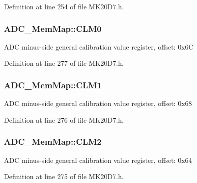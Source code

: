 Definition at line 254 of file M\+K20\+D7.\+h.

\subsubsection[{\texorpdfstring{C\+L\+M0}{CLM0}}]{ A\+D\+C\+\_\+\+Mem\+Map\+::\+C\+L\+M0}\hypertarget{struct_a_d_c___mem_map_a1b8eeb87fa8308fe93200b6e82985c25}{}\label{struct_a_d_c___mem_map_a1b8eeb87fa8308fe93200b6e82985c25}
A\+DC minus-\/side general calibration value register, offset\+: 0x6C 

Definition at line 277 of file M\+K20\+D7.\+h.

\subsubsection[{\texorpdfstring{C\+L\+M1}{CLM1}}]{ A\+D\+C\+\_\+\+Mem\+Map\+::\+C\+L\+M1}\hypertarget{struct_a_d_c___mem_map_a6c07d3719b54b23926239b53919f36d2}{}\label{struct_a_d_c___mem_map_a6c07d3719b54b23926239b53919f36d2}
A\+DC minus-\/side general calibration value register, offset\+: 0x68 

Definition at line 276 of file M\+K20\+D7.\+h.

\subsubsection[{\texorpdfstring{C\+L\+M2}{CLM2}}]{ A\+D\+C\+\_\+\+Mem\+Map\+::\+C\+L\+M2}\hypertarget{struct_a_d_c___mem_map_a2794a4dac3b6ec18535eeae7c7e2d4e3}{}\label{struct_a_d_c___mem_map_a2794a4dac3b6ec18535eeae7c7e2d4e3}
A\+DC minus-\/side general calibration value register, offset\+: 0x64 

Definition at line 275 of file M\+K20\+D7.\+h.

